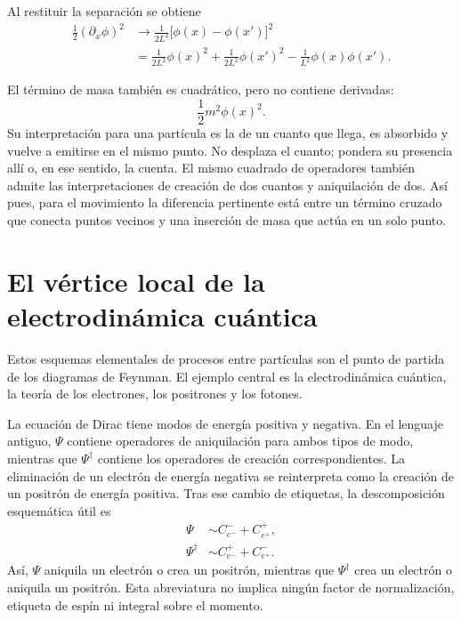 \begin{classroomqa}
\end{classroomqa}

Al restituir la separación se obtiene
\begin{align}
\frac12(\partial_x\phi)^2
&\longrightarrow
\frac{1}{2L^2}\bigl[\phi(x)-\phi(x')\bigr]^2
\\
&=
\frac{1}{2L^2}\phi(x)^2
+\frac{1}{2L^2}\phi(x')^2
-\frac{1}{L^2}\phi(x)\phi(x').
\end{align}

El término de masa también es cuadrático, pero no contiene derivadas:
\begin{equation}
\frac12m^2\phi(x)^2.
\end{equation}
Su interpretación para una partícula es la de un cuanto que llega, es absorbido y vuelve a emitirse en el mismo punto. No desplaza el cuanto; pondera su presencia allí o, en ese sentido, la cuenta. El mismo cuadrado de operadores también admite las interpretaciones de creación de dos cuantos y aniquilación de dos. Así pues, para el movimiento la diferencia pertinente está entre un término cruzado que conecta puntos vecinos y una inserción de masa que actúa en un solo punto.

\section{El vértice local de la electrodinámica cuántica}

Estos esquemas elementales de procesos entre partículas son el punto de partida de los diagramas de Feynman. El ejemplo central es la electrodinámica cuántica, la teoría de los electrones, los positrones y los fotones.

La ecuación de Dirac tiene modos de energía positiva y negativa. En el lenguaje antiguo, \(\Psi\) contiene operadores de aniquilación para ambos tipos de modo, mientras que \(\Psi^\dagger\) contiene los operadores de creación correspondientes. La eliminación de un electrón de energía negativa se reinterpreta como la creación de un positrón de energía positiva. Tras ese cambio de etiquetas, la descomposición esquemática útil es
\begin{align}
\Psi
&\sim
C^-_{e^-}+C^+_{e^+},
\\
\Psi^\dagger
&\sim
C^+_{e^-}+C^-_{e^+}.
\end{align}
Así, \(\Psi\) aniquila un electrón o crea un positrón, mientras que \(\Psi^\dagger\) crea un electrón o aniquila un positrón. Esta abreviatura no implica ningún factor de normalización, etiqueta de espín ni integral sobre el momento.


